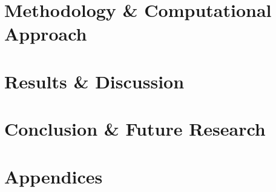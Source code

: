 \documentclass[12pt, oneside]{book}
\begin{document}
\part{Methodology \& Computational Approach}




\part{Results \& Discussion}




\part{Conclusion \& Future Research}



\appendix           %
\part*{Appendices}




 


\newpage 
\printbibliography[heading=bibintoc, title={References}]
\end{document}
